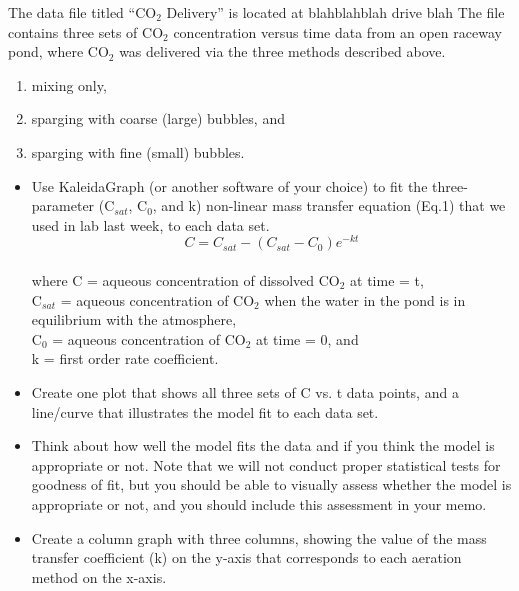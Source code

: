 \documentclass[12pt,letterpaper]{article}
\begin{document}
The data file titled ``CO$_2$ Delivery'' is located at blahblahblah drive blah %
The file contains three sets of CO$_2$ concentration versus time data from an open raceway pond, where  CO$_2$ was delivered via the three methods described above.

\begin{enumerate}
\item mixing only, 
\item sparging with coarse (large) bubbles, and 
\item sparging with fine (small) bubbles.
\end{enumerate}

\begin{itemize} 
\item Use KaleidaGraph (or another software of your choice) to fit the three-parameter (C$_{sat}$, C$_0$, and k) non-linear mass transfer equation (Eq.1) that we used in lab last week, to each data set.\\

\begin{equation}
C = C_{sat} - (C_{sat} - C_0)e^{-kt}
\end{equation}\\

where C = aqueous concentration of dissolved CO$_2$ at time = t,\\

C$_{sat}$ = aqueous concentration of CO$_2$ when the water in the pond is in equilibrium with the atmosphere,\\

C$_0$ = aqueous concentration of CO$_2$ at time = 0, and\\

k = first order rate coefficient.\\



\item Create one plot that shows all three sets of C vs. t data points, and a line/curve that illustrates the model fit to each data set. 
\item Think about how well the model fits the data and if you think the model is appropriate or not. Note that we will not conduct proper statistical tests for goodness of fit, but you should be able to visually assess whether the model is appropriate or not, and you should include this assessment in your memo.
\item Create a column graph with three columns, showing the value of the mass transfer coefficient (k) on the y-axis that corresponds to each aeration method on the x-axis.
 
\end{itemize}
\end{document}

